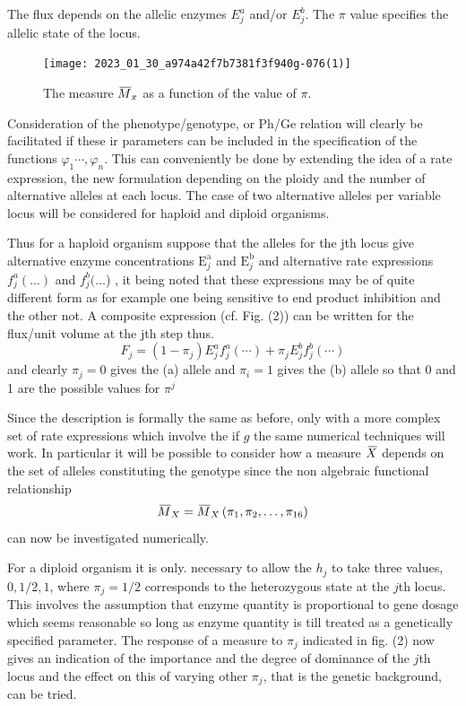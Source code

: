The flux depends on the allelic enzymes $E_{j}^{a}$ and/or $E_{j}^{b}$. The $\pi$ value specifies the allelic state of the locus.

\begin{figure}
\centering
\texttt{[image: 2023\_01\_30\_a974a42f7b7381f3f940g-076(1)]}
\caption{The measure $\,\overline{\!{M}}_{x}$ as a function of the value of $\pi$.}
\end{figure}

Consideration of the phenotype/genotype, or Ph/Ge relation will clearly be facilitated if these ir parameters can be included in the specification of the functions $\varphi_1 \cdots, \varphi_{n}$. This can conveniently be done by extending the idea of a rate expression, the new formulation depending on the ploidy and the number of alternative alleles at each locus. The case of two alternative alleles per variable locus will be considered for haploid and diploid organisms.

Thus for a haploid organism suppose that the alleles for the jth locus give alternative enzyme concentrations $\mathrm{E}_{j}^{\mathrm{a}}$ and $\mathrm{E}_{j}^{\mathrm{b}}$ and alternative rate expressions $f_{j}^{a}(\ldots)$ and $f_{j}^{b}(\ldots$) , it being noted that these expressions may be of quite different form as for example one being sensitive to end product inhibition and the other not. A composite expression (cf. Fig. (2)) can be written for the flux/unit volume at the jth step thus.
%
\begin{equation}
F_{j}=\left(1-\pi_{j}\right) E_{j}^{a} f_{j}^{a}(\cdots)+\pi_{j} E_{j}^{b} f_{j}^{b}(\cdots)
\label{eqn:26}
\end{equation}
%
and clearly $\pi_j = 0$ gives the (a) allele and $\pi_i = 1$ gives the (b) allele so that 0 and 1 are the possible values for $\pi^{j}$

Since the description is formally the same as before, only with a more complex set of rate expressions which involve the if $g$ the same numerical techniques will work. In particular it will be possible to consider how a measure $\,\overline{\!{X}}$ depends on the set of alleles constituting the genotype since the non algebraic functional relationship
%
\begin{equation}
\,\overline{\!{M}}_{X}=\,\overline{\!{M}}_{X}\left(\pi_{1}, \pi_{2}, \ldots, \pi_{16}\right)
\label{eqn:27}
\end{equation}
%
can now be investigated numerically.

For a diploid organism it is only. necessary to allow the $h_{j}$ to take three values, $0,1/2,1$, where $\pi_{j}=1/2$ corresponds to the heterozygous state at the $j$th locus. This involves the assumption that enzyme quantity is proportional to gene dosage which seems reasonable so long as enzyme quantity is till treated as a genetically specified parameter. The response of a measure to $\pi_{j}$ indicated in fig. (2) now gives an indication of the importance and the degree of dominance of the $j$th locus and the effect on this of varying other $\pi_{j}$, that is the genetic background, can be tried.

